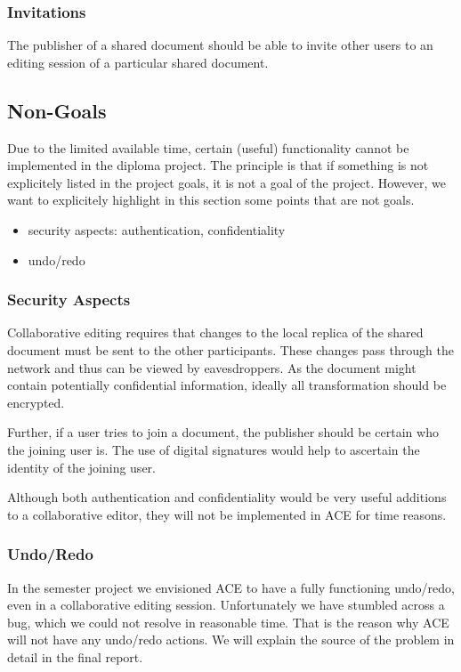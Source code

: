 \documentclass[11pt,a4paper]{article}
\begin{document}
\subsubsection{Invitations}
The publisher of a shared document should be able to invite other users to an 
editing session of a particular shared document.

\subsection{Non-Goals}

Due to the limited available time, certain (useful) functionality cannot be 
implemented in the diploma project. The principle is that if something is not
explicitely listed in the project goals, it is not a goal of the project. 
However, we want to explicitely highlight in this section some points that are 
not goals.

\begin{itemize}
 \item security aspects: authentication, confidentiality
 \item undo/redo
\end{itemize}

\subsubsection{Security Aspects}
Collaborative editing requires that changes to the local replica of the shared 
document must be sent to the other participants. These changes pass through
the network and thus can be viewed by eavesdroppers. As the document might 
contain potentially confidential information, ideally all transformation 
should be encrypted.

Further, if a user tries to join a document, the publisher should be certain 
who the joining user is. The use of digital signatures would help to 
ascertain the identity of the joining user.

Although both authentication and confidentiality would be very useful additions
to a collaborative editor, they will not be implemented in ACE for time 
reasons.

\subsubsection{Undo/Redo}
In the semester project we envisioned ACE to have a fully functioning 
undo/redo, even in a collaborative editing session. Unfortunately we have 
stumbled across a bug, which we could not resolve in reasonable time. That is 
the reason why ACE will not have any undo/redo actions. We will explain the 
source of the problem in detail in the final report. 
\end{document}

